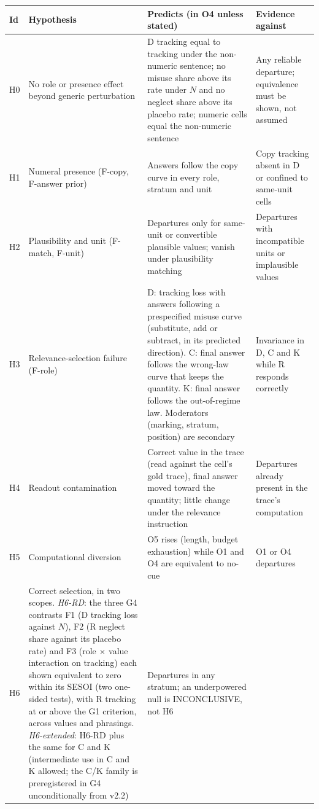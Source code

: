 \documentclass[10pt,a4paper]{article}
\begin{document}
\begin{center}\small
\begin{tabularx}{\linewidth}{@{}P{0.6cm}P{3.6cm}LL@{}}
\toprule
Id & Hypothesis & Predicts (in O4 unless stated) & Evidence against \\
\midrule
H0 & No role or presence effect beyond generic perturbation & D tracking equal to tracking under the non-numeric sentence; no misuse share above its rate under $N$ and no neglect share above its placebo rate; numeric cells equal the non-numeric sentence & Any reliable departure; equivalence must be shown, not assumed \\
H1 & Numeral presence (F-copy, F-answer prior) & Answers follow the copy curve in every role, stratum and unit & Copy tracking absent in D or confined to same-unit cells \\
H2 & Plausibility and unit (F-match, F-unit) & Departures only for same-unit or convertible plausible values; vanish under plausibility matching & Departures with incompatible units or implausible values \\
H3 & Relevance-selection failure (F-role) & D: tracking loss with answers following a prespecified misuse curve (substitute, add or subtract, in its predicted direction). C: final answer follows the wrong-law curve that keeps the quantity. K: final answer follows the out-of-regime law. Moderators (marking, stratum, position) are secondary & Invariance in D, C and K while R responds correctly \\
H4 & Readout contamination & Correct value in the trace (read against the cell's gold trace), final answer moved toward the quantity; little change under the relevance instruction & Departures already present in the trace's computation \\
H5 & Computational diversion & O5 rises (length, budget exhaustion) while O1 and O4 are equivalent to no-cue & O1 or O4 departures \\
H6 & Correct selection, in two scopes. \emph{H6-RD}: the three G4 contrasts F1 (D tracking loss against $N$), F2 (R neglect share against its placebo rate) and F3 (role $\times$ value interaction on tracking) each shown equivalent to zero within its SESOI (two one-sided tests), with R tracking at or above the G1 criterion, across values and phrasings. \emph{H6-extended}: H6-RD plus the same for C and K (intermediate use in C and K allowed; the C/K family is preregistered in G4 unconditionally from v2.2) & Departures in any stratum; an underpowered null is INCONCLUSIVE, not H6 \\
\bottomrule
\end{tabularx}
\end{center}
\end{document}
